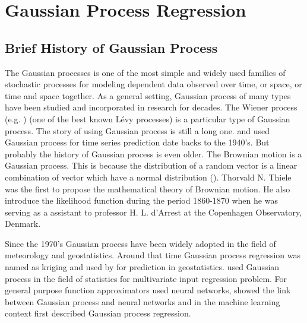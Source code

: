 
\chapter{Gaussian Process Regression} %

\label{Chapter4} %



\section{Brief History of Gaussian Process}
The Gaussian processes is one of the most simple and widely used families of stochastic processes 
for modeling dependent data observed over time, or space, or time and space together. As a general
setting, Gaussian process of many types have been studied and incorporated in research for decades.
The Wiener process (e.g. \cite{Papoulis:1991}) (one of the best known L\'{e}vy processes) is a 
particular type of Gaussian process. The story of using Gaussian process is still a long one. 
\cite{Kolmogorov:1941} and \cite{Wiener:1949} used Gaussian process for time series prediction
date backs to the 1940's.
But probably the history of Gaussian process is even older. 
The Brownian motion is a Gaussian process. This is because the distribution of a random vector 
is a linear combination of vector which have a normal distribution (\cite{Castaneda:2012}).
Thorvald N. Thiele was the first to propose the mathematical theory of Brownian motion. He also 
introduce the likelihood function during the period 1860-1870 when he was serving 
as a assistant to professor H. L. d'Arrest at the Copenhagen Observatory, Denmark. 

Since the 1970's Gaussian process have been widely adopted in the field of meteorology and
geostatistics. Around that time Gaussian process regression was named as kriging and 
used by \cite{Matheron:1973} for prediction in geostatistics. \cite{O'Hagan:1978} used 
Gaussian process in the field of statistics for multivariate input regression problem.
For general purpose function approximators \cite{Bishop:1995} used neural networks,
\cite{Neal:1996} showed the link between Gaussian process and neural networks and
in the machine learning context \cite{Williams_and_Rasmussen:1996} first described 
Gaussian process regression. 

